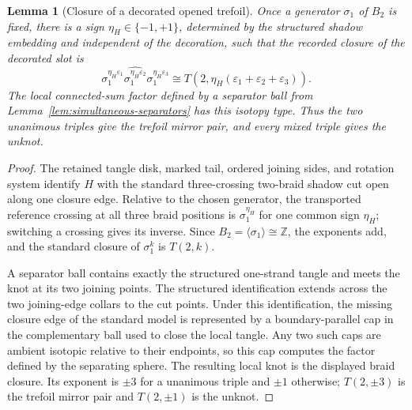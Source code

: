 \documentclass[9pt,twoside]{pnas-new}
\newtheorem{lemma}[theorem]{Lemma}
\theoremstyle{definition}
\theoremstyle{remark}
\begin{document}
\begin{lemma}[Closure of a decorated opened trefoil]
\label{lem:two-braid-closure}
Once a generator $\sigma_1$ of $B_2$ is fixed, there is a sign $\eta_H\in\{-1,+1\}$, determined by the structured shadow embedding and independent of the decoration, such that the recorded closure of the decorated slot is
\[
 \widehat{\sigma_1^{\eta_H\varepsilon_1}
             \sigma_1^{\eta_H\varepsilon_2}
             \sigma_1^{\eta_H\varepsilon_3}}
 \cong T\!\left(2,\eta_H(\varepsilon_1+\varepsilon_2+\varepsilon_3)\right).
\]
The local connected-sum factor defined by a separator ball from Lemma~\ref{lem:simultaneous-separators} has this isotopy type. Thus the two unanimous triples give the trefoil mirror pair, and every mixed triple gives the unknot.
\end{lemma}

\begin{proof}
The retained tangle disk, marked tail, ordered joining sides, and rotation system identify $H$ with the standard three-crossing two-braid shadow cut open along one closure edge. Relative to the chosen generator, the transported reference crossing at all three braid positions is $\sigma_1^{\eta_H}$ for one common sign $\eta_H$; switching a crossing gives its inverse. Since $B_2=\langle\sigma_1\rangle\cong\mathbb Z$, the exponents add, and the standard closure of $\sigma_1^k$ is $T(2,k)$.

A separator ball contains exactly the structured one-strand tangle and meets the knot at its two joining points. The structured identification extends across the two joining-edge collars to the cut points. Under this identification, the missing closure edge of the standard model is represented by a boundary-parallel cap in the complementary ball used to close the local tangle. Any two such caps are ambient isotopic relative to their endpoints, so this cap computes the factor defined by the separating sphere. The resulting local knot is the displayed braid closure. Its exponent is $\pm3$ for a unanimous triple and $\pm1$ otherwise; $T(2,\pm3)$ is the trefoil mirror pair and $T(2,\pm1)$ is the unknot.
\end{proof}
\end{document}
